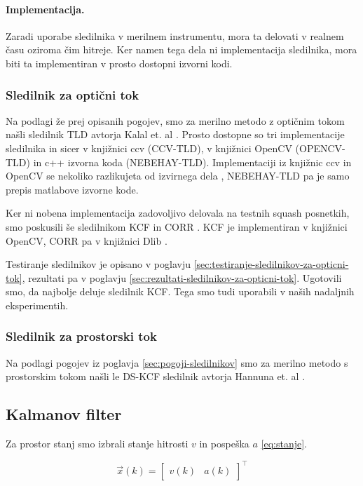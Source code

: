 \paragraph{Implementacija.} Zaradi uporabe sledilnika v merilnem instrumentu, mora ta delovati v realnem času oziroma čim hitreje. Ker namen tega dela ni implementacija sledilnika, mora biti ta implementiran v prosto dostopni izvorni kodi. 


\subsubsection{Sledilnik za optični tok}
Na podlagi že prej opisanih pogojev, smo za merilno metodo z optičnim tokom našli sledilnik TLD avtorja Kalal et. al \cite{kalal2012tracking}. Prosto dostopne so tri implementacije sledilnika in sicer v knjižnici ccv (CCV-TLD), v knjižnici OpenCV (OPENCV-TLD) in c++ izvorna koda (NEBEHAY-TLD). Implementaciji iz knjižnic ccv in OpenCV se nekoliko razlikujeta od izvirnega dela \cite{kalal2012tracking}, NEBEHAY-TLD pa je samo prepis matlabove izvorne kode. 

Ker ni nobena implementacija zadovoljivo delovala na testnih squash posnetkih, smo poskusili še sledilnikom KCF \cite{danelljan2014adaptive} in CORR \cite{danelljan2014accurate}. KCF je implementiran v knjižnici OpenCV, CORR pa v knjižnici Dlib \cite{king2009dlib}.

Testiranje sledilnikov je opisano v poglavju \ref{sec:testiranje-sledilnikov-za-opticni-tok}, rezultati pa v poglavju \ref{sec:rezultati-sledilnikov-za-opticni-tok}. Ugotovili smo, da najbolje deluje sledilnik KCF. Tega smo tudi uporabili v naših nadaljnih eksperimentih.

\subsubsection{Sledilnik za prostorski tok}
Na podlagi pogojev iz poglavja \ref{sec:pogoji-sledilnikov} smo za merilno metodo s prostorskim tokom našli le DS-KCF sledilnik avtorja Hannuna et. al \cite{hannuna2016ds}. 

\subsection{Kalmanov filter}\label{sec:implementacija-kalman}
Za prostor stanj smo izbrali stanje hitrosti $v$ in pospeška $a$ \eqref{eq:stanje}. 

\begin{equation}
\vec{x}(k) = \begin{bmatrix}
					v(k) & a(k)
				\end{bmatrix}^\top 
                \label{eq:stanje}
\end{equation}

